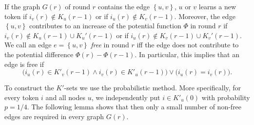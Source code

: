 \documentclass{llncs}
\newcommand{\set}[1]{\left\{#1\right\}}
\begin{document}
If the graph $G(r)$ of round $r$ contains the edge $\set{u,v}$, $u$ or
$v$ learns a new token if $i_v(r)\not\in K_u(r-1)$ or if
$i_u(r)\not\in K_v(r-1)$. Moreover, the edge $\set{u,v}$ contributes
to an increase of the potential function $\Phi$ in round $r$ if
$i_v(r)\not\in K_u(r-1)\cup K_u'(r-1)$ or if $i_u(r)\not\in
K_v(r-1)\cup K_v'(r-1)$. We call an edge $e=\set{u,v}$ \emph{free} in
round $r$ iff the edge does not contribute to the potential difference
$\Phi(r)-\Phi(r-1)$. In particular, this implies that an edge is free
if
\begin{equation}\label{eq:freeedge}
    \big(i_u(r)\in K'_v(r-1) \land i_v(r)\in K'_u(r-1)\big) \lor \big(i_u(r)=i_v(r)\big).
\end{equation}

To construct the $K'$-sets we use the probabilistic method. More
specifically, for every token $i$ and all nodes $u$, we independently
put $i \in K'_u(0)$ with probability $p=1/4$. The following lemma shows
that then only a small number of non-free edges are required in every
graph $G(r)$.
\end{document}

